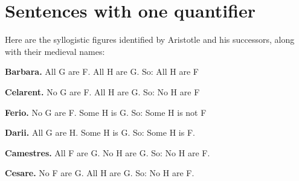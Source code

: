 

\chapter{Sentences with one quantifier}\label{s:MoreMonadic}\setcounter{ProbPart}{0}
\problempart
\label{pr.BarbaraEtc}
Here are the syllogistic figures identified by Aristotle and his successors, along with their medieval names:
\begin{compactlist}
	\item \textbf{Barbara.} All G are F. All H are G. So:  All H are F
	\item[] 
	\item \textbf{Celarent.} No G are F. All H are G. So: No H are F
	\item[] 
	\item \textbf{Ferio.} No G are F. Some H is G. So: Some H is not F
	\item[] 
	\item \textbf{Darii.} All G are H. Some H is G. So: Some H is F.
	\item[] 
	\item \textbf{Camestres.} All F are G. No H are G. So: No H are F.
	\item[] 
	\item \textbf{Cesare.} No F are G. All H are G. So: No H are F.
	\item[] 

\end{compactlist}

